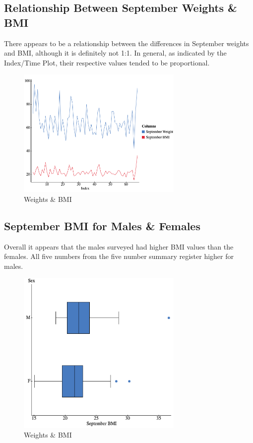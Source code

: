 \documentclass[12pt,fleqn]{article}
\begin{document}
\subsection{Relationship Between September Weights \& BMI}
There appears to be a relationship between the differences in September weights and BMI, although it is definitely not 1:1. In general, as indicated by the Index/Time Plot, their respective values tended to be proportional.
\begin{figure}[ht]
  \centering
  \includegraphics[width=8cm]{assets/weights-and-bmi.png}
  \caption{Weights \& BMI}
\end{figure}

\pagebreak
\subsection{September BMI for Males \& Females}
Overall it appears that the males surveyed had higher BMI values than the females. All five numbers from the five number summary register higher for males.
\begin{figure}[ht]
  \centering
  \includegraphics[width=8cm]{assets/males-vs-females.png}
  \caption{Weights \& BMI}
\end{figure}
\end{document}
